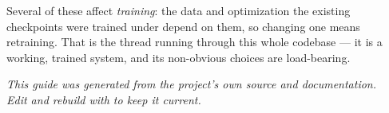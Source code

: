 \noindent Several of these affect \emph{training}: the data and optimization the existing
checkpoints were trained under depend on them, so changing one means retraining. That is
the thread running through this whole codebase --- it is a working, trained system, and its
non-obvious choices are load-bearing.

\vspace{1cm}
\begin{center}
\textit{This guide was generated from the project's own source and documentation.\\
Edit  and rebuild with  to keep it current.}
\end{center}
